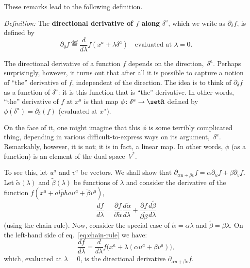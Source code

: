 \documentclass[10pt, a4paper]{article}
\newcommand{\isdef}{\mathrel{\stackrel{\text{def}}{=}}}
\begin{document}
These remarks lead to the following definition.

\emph{Definition:} The \textbf{directional derivative of $f$ along
  $\delta^a$}, which we write as $\partial_\delta f$, is defined by
\begin{equation}
\partial_\delta f \isdef \frac{d}{d\lambda} f(x^a+\lambda\delta^a) \quad\text{evaluated at $\lambda = 0$}.
  \label{eq:directional-derivative}
\end{equation}

The directional derivative of a function $f$ depends on the
direction,~$\delta^a$. Perhaps surprisingly, however, it turns out that
after all it is possible to capture a notion of ``the'' derivative of
$f$, independent of the direction. The idea is to think of
$\partial_\delta f$ as a function of $\delta^a$: it is this function that is ``the''
derivative. In other words, ``the'' derivative of $f$ at $x^a$ is that
map $\phi\colon \delta^a\to\setR$ defined by
$\phi(\delta^a) = \partial_\delta(f)$ (evaluated at $x^a$).

On the face of it, one might imagine that this $\phi$ is some terribly
complicated thing, depending in various difficult-to-express ways on
its argument,~$\delta^a$. Remarkably, however, it is not; it is in fact, a
linear map. In other words, $\phi$ (as a function) is an element of the
dual space~$V^*$.

To see this, let $u^a$ and $v^a$ be vectors. We shall show that
$\partial_{\alpha u+\beta v}f = \alpha\partial_u f+ \beta\partial_v f$. Let
$\tilde{\alpha}(\lambda)$ and $\tilde{\beta}(\lambda)$ be functions of
$\lambda$ and consider the derivative of the function
$f(x^a+\tilde{alpha}u^a+\tilde{\beta}v^a)$,
\begin{equation*}
  \frac{df}{d\lambda} = \frac{\partial f}{\partial \tilde{\alpha}} \frac{d\tilde{\alpha}}{d\lambda} +
  \frac{\partial f}{\partial \tilde{\beta}} \frac{d\tilde{\beta}}{d\lambda}
  \label{eq:chain-rule}
  \end{equation*}
  (using the chain rule). Now, consider the special case of
  $\tilde{\alpha}=\alpha\lambda$ and $\tilde{\beta}=\beta\lambda$. On the left-hand side of
  eq.~\eqref{eq:chain-rule} we have:
  \begin{equation*}
    \frac{df}{d\lambda} = \frac{d}{d\lambda} f\bigl(x^a+\lambda(\alpha u^a +\beta v^a)\bigr), 
  \end{equation*}
which, evaluated at $\lambda=0$, is the directional derivative $\partial_{\alpha u+\beta v}
f$.
\end{document}
